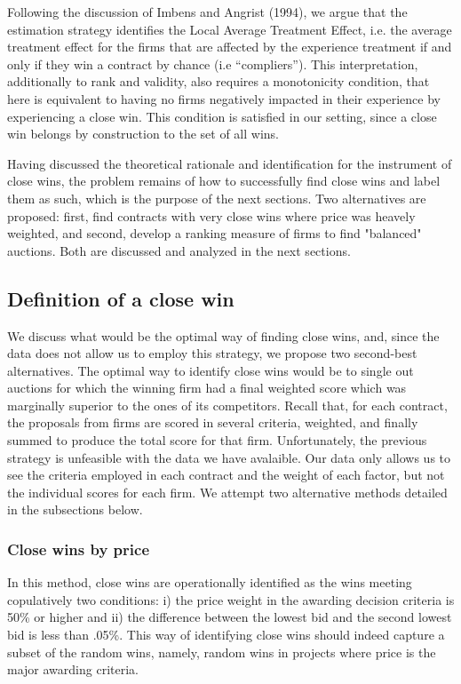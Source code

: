  Following the discussion of Imbens and Angrist (1994), we argue that the estimation strategy identifies the Local Average Treatment Effect, i.e. the average treatment effect for the firms that are affected by the experience treatment if and only if they win a contract by chance (i.e “compliers”). This interpretation, additionally to rank and validity, also requires a monotonicity condition, that here is equivalent to having no firms negatively impacted in their experience by experiencing a close win. This condition is satisfied in our setting, since a close win belongs by construction to the set of all wins.

Having discussed the theoretical rationale and identification for the instrument of close wins, the problem remains of how to successfully find close wins and label them as such, which is the purpose of the next sections. Two alternatives are proposed: first, find contracts with very close wins where price was heavely weighted, and second, develop a ranking measure of firms to find "balanced" auctions. Both are discussed and analyzed in the next sections.

\subsection{Definition of a close win}
We discuss what would be the optimal way of finding close wins, and, since the data does not allow us to employ this strategy, we propose two second-best alternatives.
The optimal way to identify close wins would be to single out auctions for which the winning firm had a final weighted score which was marginally superior to the ones of its competitors.  Recall that, for each contract, the  proposals from firms are scored in several criteria, weighted, and finally summed to produce the total score for that firm. Unfortunately, the previous strategy is unfeasible with the data we have avalaible. Our data only allows us to see the criteria employed in each contract and the weight of each factor, but not the individual scores for each firm. We attempt two alternative methods detailed in the subsections below.

\subsubsection{Close wins by price}
In this method, close wins are operationally identified as the wins meeting copulatively  two conditions: i) the price weight in the awarding decision criteria is 50\% or higher and ii) the difference between the lowest bid and the second lowest bid is less than .05\%. This way of identifying close wins should indeed capture a subset of the random wins, namely, random wins in projects where price is the major awarding criteria.

